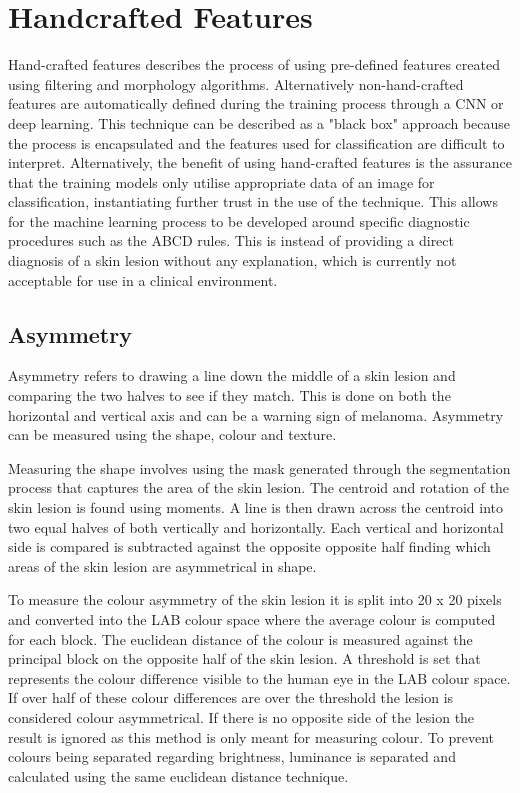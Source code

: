 \documentclass[12pt]{report}
\begin{document}
\section{Handcrafted Features}
Hand-crafted features describes the process of using pre-defined features created using filtering and morphology algorithms. Alternatively non-hand-crafted features are automatically defined during the training process through a CNN or deep learning. This technique can be described as a "black box" approach because the process is encapsulated and the features used for classification are difficult to interpret. Alternatively, the benefit of using hand-crafted features is the assurance that the training models only utilise appropriate data of an image for classification, instantiating further trust in the use of the technique. This allows for the machine learning process to be developed around specific diagnostic procedures such as the ABCD rules. This is instead of providing a direct diagnosis of a skin lesion without any explanation, which is currently not acceptable for use in a clinical environment.

\subsection{Asymmetry}
Asymmetry refers to drawing a line down the middle of a skin lesion and comparing the two halves to see if they match. This is done on both the horizontal and vertical axis and can be a warning sign of melanoma. Asymmetry can be measured using the shape\cite{Zaqout2016}, colour\cite{Kasmi2016a} and texture\cite{Ali2020a}.

Measuring the shape involves using the mask generated through the segmentation process that captures the area of the skin lesion\cite{Zaqout2016}. The centroid and rotation of the skin lesion is found using moments. A line is then drawn across the centroid into two equal halves of both vertically and horizontally. Each vertical and horizontal side is compared is subtracted against the opposite opposite half finding which areas of the skin lesion are asymmetrical in shape.

To measure the colour asymmetry \cite{Kasmi2016a} of the skin lesion it is split into 20 x 20 pixels and converted into the LAB colour space where the average colour is computed for each block. The euclidean distance of the colour is measured against the principal block on the opposite half of the skin lesion. A threshold is set that represents the colour difference visible to the human eye in the LAB colour space\cite{Myridis2014a}. If over half of these colour differences are over the threshold the lesion is considered colour asymmetrical. If there is no opposite side of the lesion the result is ignored as this method is only meant for measuring colour. To prevent colours being separated regarding brightness, luminance is separated and calculated using the same euclidean distance technique.
\end{document}
